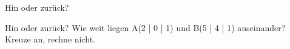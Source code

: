 \setcounter{aufgabe}{8}

\begin{aufgabe}{Hin oder zurück?}
\begin{teile}
\teil Hin oder zurück? Wie weit liegen A(2 | 0 | 1) und B(5 | 4 | 1) auseinander? Kreuze an, rechne nicht. \\  \\ 
\end{teile}
\end{aufgabe}


